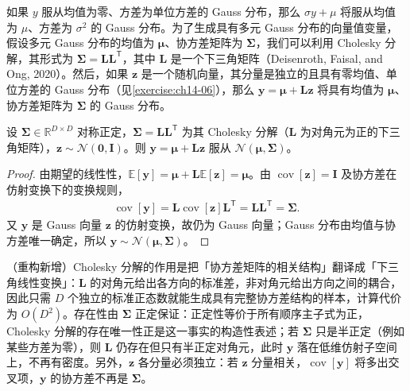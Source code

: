 \documentclass[../../main.tex]{subfiles}
\begin{document}
如果 $y$ 服从均值为零、方差为单位方差的 Gauss 分布，那么 $\sigma y+\mu$ 将服从均值为 $\mu$、方差为 $\sigma^{2}$ 的 Gauss 分布。为了生成具有多元 Gauss 分布的向量值变量，假设多元 Gauss 分布的均值为 $\bm{\mu}$、协方差矩阵为 $\bm{\Sigma}$，我们可以利用 Cholesky 分解，其形式为 $\bm{\Sigma}=\bm{L}\bm{L}^{\mathsf{T}}$，其中 $\bm{L}$ 是一个下三角矩阵（Deisenroth, Faisal, and Ong, 2020）。然后，如果 $\bm{z}$ 是一个随机向量，其分量是独立的且具有零均值、单位方差的 Gauss 分布（见\cref{exercise:ch14-06}），那么 $\bm{y}=\bm{\mu}+\bm{L}\bm{z}$ 将具有均值为 $\bm{\mu}$、协方差矩阵为 $\bm{\Sigma}$ 的 Gauss 分布。

\begin{proposition}\label{proposition:ch14-cholesky}
设 $\bm{\Sigma}\in\mathbb{R}^{D\times D}$ 对称正定，$\bm{\Sigma}=\bm{L}\bm{L}^{\mathsf{T}}$ 为其 Cholesky 分解（$\bm{L}$ 为对角元为正的下三角矩阵），$\bm{z}\sim\mathcal{N}(\bm{0},\bm{I})$。则 $\bm{y}=\bm{\mu}+\bm{L}\bm{z}$ 服从 $\mathcal{N}(\bm{\mu},\bm{\Sigma})$。
\end{proposition}

\begin{proof}
由期望的线性性，$\mathbb{E}[\bm{y}]=\bm{\mu}+\bm{L}\mathbb{E}[\bm{z}]=\bm{\mu}$。由 $\operatorname{cov}[\bm{z}]=\bm{I}$ 及协方差在仿射变换下的变换规则，
\begin{align*}
\operatorname{cov}[\bm{y}]=\bm{L}\operatorname{cov}[\bm{z}]\bm{L}^{\mathsf{T}}=\bm{L}\bm{L}^{\mathsf{T}}=\bm{\Sigma}.
\end{align*}
又 $\bm{y}$ 是 Gauss 向量 $\bm{z}$ 的仿射变换，故仍为 Gauss 向量；Gauss 分布由均值与协方差唯一确定，所以 $\bm{y}\sim\mathcal{N}(\bm{\mu},\bm{\Sigma})$。
\end{proof}

\begin{remark}（重构新增）Cholesky 分解的作用是把「协方差矩阵的相关结构」翻译成「下三角线性变换」：$\bm{L}$ 的对角元给出各方向的标准差，非对角元给出方向之间的耦合，因此只需 $D$ 个独立的标准正态数就能生成具有完整协方差结构的样本，计算代价为 $O(D^{2})$。存在性由 $\bm{\Sigma}$ 正定保证：正定性等价于所有顺序主子式为正，Cholesky 分解的存在唯一性正是这一事实的构造性表述；若 $\bm{\Sigma}$ 只是半正定（例如某些方差为零），则 $\bm{L}$ 仍存在但只有半正定对角元，此时 $\bm{y}$ 落在低维仿射子空间上，不再有密度。另外，$\bm{z}$ 各分量必须独立：若 $\bm{z}$ 分量相关，$\operatorname{cov}[\bm{y}]$ 将多出交叉项，$\bm{y}$ 的协方差不再是 $\bm{\Sigma}$。
\end{remark}
\end{document}
